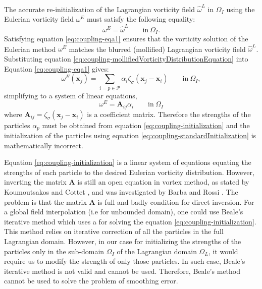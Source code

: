 	The accurate re-initialization of the Lagrangian vorticity field $\hat{\omega}^L$ in $\Omega_I$ using the Eulerian vorticity field $\omega^E$ must satisfy the following equality:
		\begin{equation}
		\omega^E = \hat{\omega}^L \qquad \mathrm{in}\ \Omega_I.
		\label{eq:coupling-eqa1}
		\end{equation} 
	Satisfying equation \ref{eq:coupling-eqa1} ensures that the vorticity solution of the Eulerian method $\omega^E$ matches the blurred (mollified) Lagrangian vorticity field $\hat{\omega}^L$. Substituting equation \ref{eq:coupling-mollifiedVorticityDistributionEquation} into Equation \ref{eq:coupling-eqa1} gives:
		\begin{equation}
		\omega^E(\mathbf{x}_j) = \sum_{i=p\in\mathcal{P}} \alpha_i \zeta_{\sigma}(\mathbf{x}_j - \mathbf{x}_i) \qquad \mathrm{in}\ \Omega_I, 
		\end{equation}
	simplifying to a system of linear equations,
		\begin{equation}
		\omega^E = \mathbf{A}_{ij}\alpha_i \qquad \mathrm{in}\ \Omega_I
		\label{eq:coupling-initialization}
		\end{equation}
	where $\mathbf{A}_{ij}=\zeta_{\sigma}(\mathbf{x}_j-\mathbf{x}_i)$ is a coefficient matrix. Therefore the strengths of the particles $\alpha_p$ must be obtained from equation \ref{eq:coupling-initialization} and the initialization of the particles using equation \ref{eq:coupling-standardInitialization} is mathematically incorrect. 
	
	Equation \ref{eq:coupling-initialization} is a linear system of equations equating the strengths of each particle to the desired Eulerian vorticity distribution. However, inverting the matrix $\mathbf{A}$ is still an open equation in vortex method, as stated by Koumoutsakos and Cottet \cite{Cottet2000a}, and was investigated by Barba and Rossi \cite{Barba2010a}. The problem is that the matrix $\mathbf{A}$ is full and badly condition for direct inversion. For a global field interpolation (i.e for unbounded domain), one could use Beale's iterative method which uses a  for solving the equation \ref{eq:coupling-initialization}. This method relies on iterative correction of all the particles in the full Lagrangian domain. However, in our case for initializing the strengths of the particles only in the sub-domain $\Omega_{I}$ of the Lagrangian domain $\Omega_L$, it would require us to modify the strength of only those particles. In such case, Beale's iterative method is not valid and cannot be used. Therefore, Beale's method cannot be used to solve the problem of smoothing error.

